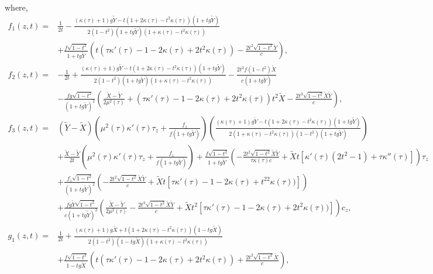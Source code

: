 \documentclass[3p,11pt]{elsarticle}
\numberwithin{equation}{section}
\begin{document}
where,
\begin{equation*}\label{Sol4_6}
    \begin{split}
        f_1(z,t)=&\frac{1}{2t}-\frac{(\kappa(\tau)+1)g\widetilde Y-t(1+2\kappa(\tau)-t^2\kappa(\tau))(1+tg\widetilde Y)}{2(1-t^2)(1+tg\widetilde Y)(1+\kappa(\tau)-t^2\kappa(\tau))}\\ &+\frac{f\sqrt{1-t^2}}{1+tg\widetilde Y} \left(t(\tau\kappa' (\tau)-1-2\kappa(\tau)+2t^2\kappa(\tau))-\frac{2t^2\sqrt{1-t^2}\widetilde Y}{c} \right),\\
         f_2(z,t)=&-\frac{1}{2t}+\frac{(\kappa(\tau)+1)g\widetilde Y-t(1+2\kappa(\tau)-t^2\kappa(\tau))(1+tg\widetilde Y)}{2(1-t^2)(1+tg\widetilde Y)(1+\kappa(\tau)-t^2\kappa(\tau))}-\frac{2t^2f(1-t^2)\widetilde X}{c(1+tg\widetilde Y)}\\ 
         &-\frac{fg\sqrt{1-t^2}}{(1+tg\widetilde Y)^2}\left(\frac{\widetilde X-\widetilde Y}{2\mu^2(\tau)}+(\tau\kappa'(\tau)-1-2\kappa(\tau)+2t^2\kappa(\tau))t^2\widetilde X-\frac{2t^3\sqrt{1-t^2}\widetilde X\widetilde Y}{c} \right),\\
         f_3(z,t)=& (\widetilde Y-\widetilde X)\left(\mu^2(\tau)\kappa'(\tau)\tau_z+\frac{f_z}{f(1+tg\widetilde Y)} \right)\left( \frac{(\kappa(\tau)+1)g\widetilde Y-t(1+2\kappa(\tau)-t^2\kappa(\tau))(1+tg\widetilde Y)}{2(1+\kappa(\tau)-t^2\kappa(\tau))(1-t^2)(1+tg\widetilde Y)}\right)\\ 
         &+ \frac{\widetilde X-\widetilde Y}{2t}\left(\mu^2(\tau)\kappa'(\tau)\tau_z+\frac{f_z}{f(1+tg\widetilde Y)} \right)+\frac{f\sqrt{1-t^2}}{1+tg\widetilde Y}\left(-\frac{2t^2\sqrt{1-t^2}\widetilde X\widetilde Y}{\tau\kappa(\tau)c}+\widetilde X t[\kappa'(\tau)(2t^2-1)+\tau\kappa''(\tau)]\right)\tau_z\\
         &+\frac{f_z\sqrt{1-t^2}}{(1+tg\widetilde Y)^2}\left(-\frac{2t^2\sqrt{1-t^2}\widetilde X\widetilde Y}{c}+\widetilde X t[\tau\kappa'(\tau)-1-2\kappa(\tau)+t^22\kappa(\tau))]\right) \\
         &+ \frac{fg\widetilde Y\sqrt{1-t^2}}{c(1+tg\widetilde Y)^2}\left(\frac{\widetilde X-\widetilde Y}{2\mu^2(\tau)}-\frac{2t^3\sqrt{1-t^2}\widetilde X\widetilde Y}{c}+\widetilde X t^2[\tau\kappa'(\tau)-1-2\kappa(\tau)+2t^2\kappa(\tau))]\right)c_z,\\
         g_1(z,t)=&\frac{1}{2t}+\frac{(\kappa(\tau)+1)g\widetilde X+t(1+2\kappa(\tau)-t^2\kappa(\tau))(1-tg\widetilde X)}{2(1-t^2)(1-tg\widetilde X)(1+\kappa(\tau)-t^2\kappa(\tau))}\\ &+\frac{f\sqrt{1-t^2}}{1-tg\widetilde X} \left(t(\tau\kappa' (\tau)-1-2\kappa(\tau)+2t^2\kappa(\tau))+\frac{2t^2\sqrt{1-t^2}\widetilde X}{c} \right),\\

\end{split}
\end{equation*}
\end{document}
